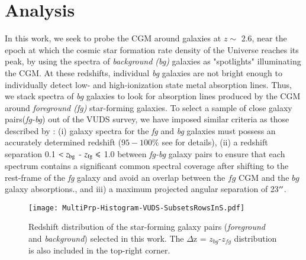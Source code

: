 \documentclass[longauth]{aa}
\begin{document}
\section{Analysis}\label{sec:Ana}

In this work, we seek to probe the CGM around galaxies at  $z \sim$ 2.6, near
the epoch at which the cosmic star formation rate density of the Universe
reaches its peak, by using the spectra of \textit{background (bg)} galaxies
as "spotlights" illuminating the CGM. At these redshifts, individual \textit
{bg} galaxies are not bright enough to individually detect low- and
high-ionization state metal absorption lines. Thus, we stack spectra
of \textit{bg} galaxies to look for absorption lines produced by the CGM
around \textit{foreground (fg)} star-forming galaxies. To select a sample of
close galaxy pairs(\textit{fg-bg}) out of the VUDS survey, we have imposed
similar criteria as those described by \cite {Steidel10}: (i) galaxy spectra
for the \textit{fg} and \textit{bg} galaxies must possess an accurately 
determined redshift ($95-100\%$ see \citealt{LeFevre15,Tasca17} for details), 
(ii) a redshift separation 0.1 $< z_{\rm{bg}}$ - $z_{\rm{fg}} \leqslant$ 1.0
between \textit{fg-bg} galaxy pairs to ensure that each spectrum contains a
significant common spectral coverage after shifting to the rest-frame of
the \textit {fg} galaxy and avoid an overlap between the $fg$ CGM and the
$bg$ galaxy absorptions., and iii) a maximum projected angular separation of
23$^{\prime\prime}$.

\begin{figure}
\centering
\texttt{[image: MultiPrp-Histogram-VUDS-SubsetsRowsInS.pdf]}
\caption{Redshift distribution of the star-forming galaxy pairs 
(\textit{foreground} and \textit{background}) selected in this work.
The $\Delta$z = $z_{bg}$-$z_{fg}$ distribution is also included in the top-right 
corner.}
\label{Fig:PairsHistZ}%
\end{figure}  
\end{document}
